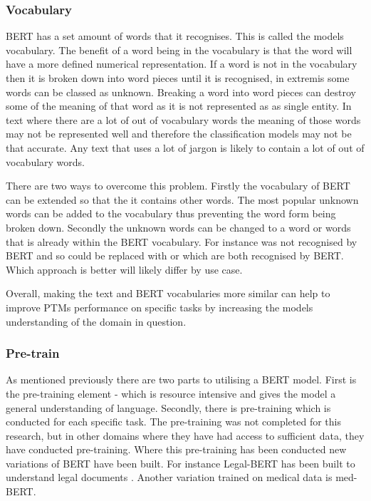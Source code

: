 \subsubsection{Vocabulary} BERT has a set amount of words that it recognises. This is called the models vocabulary. The benefit of a word being in the vocabulary is that the word will have a more defined numerical representation. If a word is not in the vocabulary then it is broken down into word pieces until it is recognised, in extremis some words can be classed as unknown. Breaking a word into word pieces can destroy some of the meaning of that word as it is not represented as as single entity. In text where there are a lot of out of vocabulary words the meaning of those words may not be represented well and therefore the classification models may not be that accurate. Any text that uses a lot of jargon is likely to contain a lot of out of vocabulary words.

There are two ways to overcome this problem. Firstly the vocabulary of BERT can be extended so that the it contains other words. The most popular unknown words can be added to the vocabulary thus preventing the word form being broken down. Secondly the unknown words can be changed to  a word or words that is already within the BERT vocabulary.  For instance  was not recognised by BERT and so could be replaced with  or  which are both recognised by BERT. Which approach is better will likely differ by use case.

Overall, making the text and BERT vocabularies more similar can help to improve PTMs performance on specific tasks by increasing the models understanding of the domain in question.

\subsubsection{Pre-train} As mentioned previously there are two parts to utilising a BERT model. First is the pre-training element - which is resource intensive and  gives the model a general understanding of language. Secondly, there is pre-training which is conducted for each specific task. The pre-training was not completed for this research, but in other domains where they have had access to sufficient data, they have conducted pre-training. Where this pre-training has been conducted new variations of BERT have been built. For instance Legal-BERT has been built to understand legal documents \parencite{legal_bert}. Another variation trained on medical data is med-BERT. 

